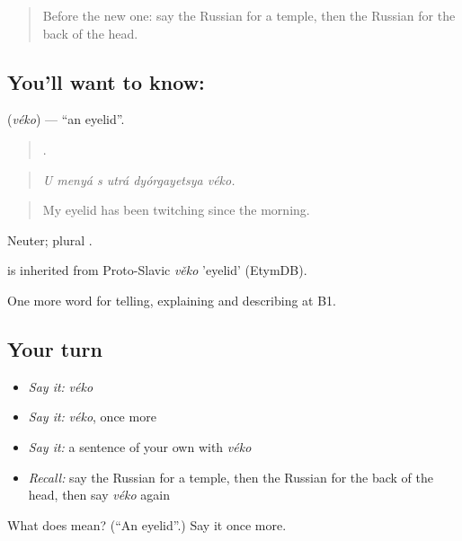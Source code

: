 \begin{quote}
Before the new one: say the Russian for a temple, then the Russian for the back of the head.
\end{quote}

\subsection*{You'll want to know: }
\textbf{} (\emph{véko}) — \textquotedblleft{}an eyelid\textquotedblright{}.

\begin{quote}
     .
\end{quote}

\begin{quote}
\emph{U menyá s utrá dyórgayetsya véko.}
\end{quote}

\begin{quote}
My eyelid has been twitching since the morning.
\end{quote}

Neuter; plural .

\begin{cousinweb}
\emph{} is inherited from Proto-Slavic \emph{věko} 'eyelid' (EtymDB).
\end{cousinweb}

\begin{grammarlens}[title={What you've built}]
One more word for telling, explaining and describing at B1.
\end{grammarlens}

\subsection*{Your turn}
\begin{itemize}
\raggedright
  \item \emph{Say it:} \emph{véko}
  \item \emph{Say it:} \emph{véko}, once more
  \item \emph{Say it:} a sentence of your own with \emph{véko}
  \item \emph{Recall:} say the Russian for a temple, then the Russian for the back of the head, then say \emph{véko} again
\end{itemize}

\begin{tcolorbox}[breakable,colback=teal!4,colframe=teal!35!black,title={Before you move on}]
What does  mean? (\textquotedblleft{}An eyelid\textquotedblright{}.) Say it once more.
\end{tcolorbox}

